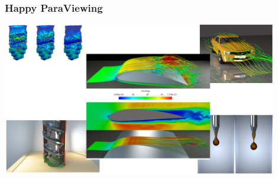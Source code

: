 \documentclass[t]{beamer}
\begin{document}
%
%
%		
%
%
%
%
%		
%		
%
%
%
%
%
%		


%
%
%
%
%
\begin{frame}
  \frametitle{Happy ParaViewing}

    \includegraphics[width=0.9\textwidth]{screenshots/paraviewing.png}

\end{frame}
\end{document}
